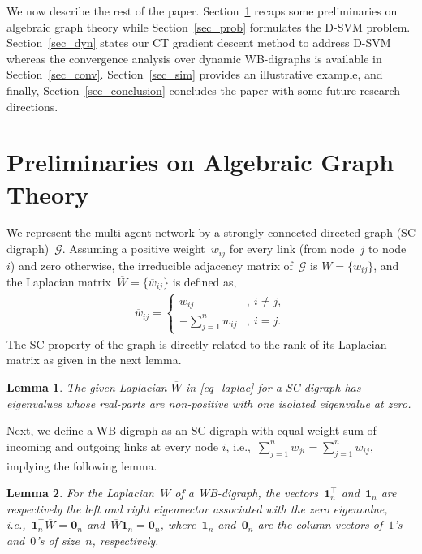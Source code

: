 \documentclass[letterpaper, 10pt, conference]{ieeeconf}
\newtheorem{lem}{Lemma}
\def\mb{\mathbf}
\def\mc{\mathcal}
\begin{document}
We now describe the rest of the paper. Section~\ref{sec_pre} recaps some preliminaries on algebraic graph theory while Section~\ref{sec_prob} formulates the D-SVM problem. Section~\ref{sec_dyn} states our CT gradient descent method to address D-SVM whereas the convergence analysis over dynamic WB-digraphs is available in Section~\ref{sec_conv}. Section~\ref{sec_sim} provides an illustrative example, and finally, Section~\ref{sec_conclusion} concludes the paper with some future research directions.   

\section{Preliminaries on Algebraic Graph Theory} \label{sec_pre}
We represent the multi-agent network by a strongly-connected directed graph (SC digraph)~$\mc{G}$.
Assuming a positive weight~$w_{ij}$ for every link (from node~$j$ to node~$i$) and zero otherwise,  the irreducible adjacency matrix of~$\mc G$ is $W=\{w_{ij}\}$, and the Laplacian matrix~$\overline{W}=\{\overline{w}_{ij}\}$ is defined as, 
\begin{eqnarray} \label{eq_laplac}
      \overline{w}_{ij}=\left \{ \begin{array}{ll} w_{ij} & ,~ i\neq j, \\ -\sum_{j=1}^n w_{ij} & ,~ i=j. \end{array}\right.
\end{eqnarray}
The SC property of the graph is directly related to the rank of its Laplacian matrix as given in the next lemma.
\begin{lem} \label{lem_sc}
	\cite{SensNets:Olfati04} The given Laplacian $\overline{W}$ in \eqref{eq_laplac} for a SC digraph
	has  eigenvalues whose real-parts are non-positive with one isolated eigenvalue at zero.
\end{lem}
Next, we define a WB-digraph as an SC digraph with equal weight-sum of incoming and outgoing links at every node $i$, i.e.,~$\sum_{j=1}^n w_{ji} = \sum_{j=1}^n w_{ij}$,
implying the following lemma.  
\begin{lem} \label{lem_laplacian}
	\cite{SensNets:Olfati04} For the Laplacian~$\overline{W}$ of a WB-digraph, the vectors~$\mb{1}_n^\top$ and~$\mb{1}_n$ are respectively the left and right eigenvector associated with the zero eigenvalue, i.e.,~$\mb{1}_n^\top \overline{W}= \mb{0}_n$ and~$\overline{W}\mb{1}_n=\mb{0}_n$, where~$\mb{1}_n$ and~$\mb{0}_n$ are the column vectors of~$1$'s and~$0$'s of size~$n$, respectively.
\end{lem}
\end{document}
